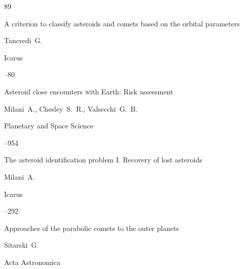 \begin{thebibliography}{89}



\paper A criterion to classify asteroids and comets based on the orbital parameters

\by Tancredi~G.

\jour Icarus



--80






\paper Asteroid close encounters with Earth: Risk assessment

\by Milani~A., Chesley~S.~R., Valsecchi~G.~B.

\jour Planetary and Space Science




–954






\paper The asteroid identification problem I. Recovery of lost asteroids

\by Milani~A.

\jour Icarus




–292






\paper Approaches of the parabolic comets to the outer planets

\by Sitarski~G.

\jour Acta Astronomica 





\end{thebibliography}
